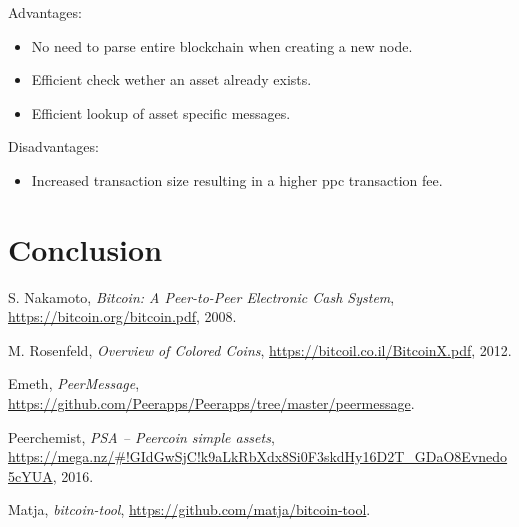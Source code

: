 \documentclass[a4paper,10pt]{article}
\begin{document}
Advantages:
\begin{itemize}
 \item No need to parse entire blockchain when creating a new node.
 \item Efficient check wether an asset already exists.
 \item Efficient lookup of asset specific messages.
\end{itemize}

Disadvantages:
\begin{itemize}
 \item Increased transaction size resulting in a higher ppc transaction fee.
\end{itemize}

\section{Conclusion}


\begin{thebibliography}{9}

  S. Nakamoto,
  \emph{Bitcoin: A Peer-to-Peer Electronic Cash System},
  \url{https://bitcoin.org/bitcoin.pdf},
  2008.

  M. Rosenfeld,
  \emph{Overview of Colored Coins},
  \url{https://bitcoil.co.il/BitcoinX.pdf},
  2012.

  Emeth,
  \emph{PeerMessage},
  \url{https://github.com/Peerapps/Peerapps/tree/master/peermessage}.

  Peerchemist,
  \emph{PSA – Peercoin simple assets},
  \url{https://mega.nz/#!GIdGwSjC!k9aLkRbXdx8Si0F3skdHy16D2T_GDaO8Evnedo5cYUA},
  2016.

  Matja,
  \emph{bitcoin-tool},
  \url{https://github.com/matja/bitcoin-tool}.

\end{thebibliography}
\end{document}
